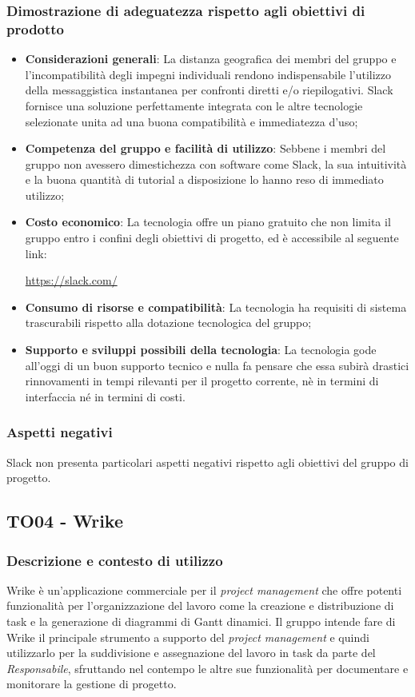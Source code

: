 \documentclass[./../Technology Baseline.tex]{subfiles}
\begin{document}
\subsubsection{Dimostrazione di adeguatezza rispetto agli obiettivi di prodotto}
\begin{itemize}
	\item \textbf{Considerazioni generali}: La distanza geografica dei membri del gruppo e l'incompatibilità degli impegni individuali rendono indispensabile l'utilizzo della messaggistica instantanea per confronti diretti e/o riepilogativi. Slack fornisce una soluzione perfettamente integrata con le altre tecnologie selezionate unita ad una buona compatibilità e immediatezza d'uso;
	\item \textbf{Competenza del gruppo e facilità di utilizzo}: Sebbene i membri del gruppo non avessero dimestichezza con software come Slack, la sua intuitività e la buona quantità di tutorial a disposizione lo hanno reso di immediato utilizzo;
	\item \textbf{Costo economico}: La tecnologia offre un piano gratuito che non limita il gruppo entro i confini degli obiettivi di progetto, ed è accessibile al seguente link:
	\begin{center}
		\url{https://slack.com/}
	\end{center}
	\item \textbf{Consumo di risorse e compatibilità}: La tecnologia ha requisiti di sistema trascurabili rispetto alla dotazione tecnologica del gruppo;
	\item \textbf{Supporto e sviluppi possibili della tecnologia}: La tecnologia gode all'oggi di un buon supporto tecnico e nulla fa pensare che essa subirà drastici rinnovamenti in tempi rilevanti per il progetto corrente, nè in termini di interfaccia né in termini di costi.
\end{itemize}

\subsubsection{Aspetti negativi}
Slack non presenta particolari aspetti negativi rispetto agli obiettivi del gruppo di progetto.

\subsection{TO04 - Wrike}

\subsubsection{Descrizione e contesto di utilizzo}
Wrike è un'applicazione commerciale per il \textit{project management} che offre potenti funzionalità per l'organizzazione del lavoro come la creazione e distribuzione di task e la generazione di diagrammi di Gantt dinamici. Il gruppo intende fare di Wrike il principale strumento a supporto del \textit{project management} e quindi utilizzarlo per la suddivisione e assegnazione del lavoro in task da parte del \textit{Responsabile}, sfruttando nel contempo le altre sue funzionalità per documentare e monitorare la gestione di progetto. 
\end{document}

